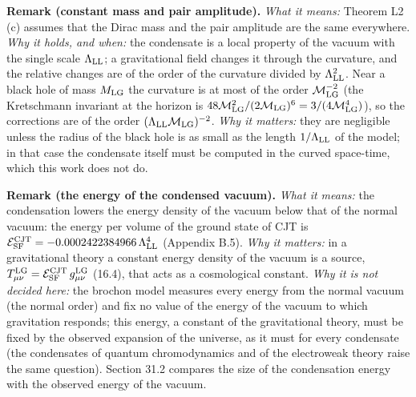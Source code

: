 \documentclass[
  10pt,
]{article}
\begin{document}
\textbf{Remark (constant mass and pair amplitude).} \emph{What it
means:} Theorem L2 (c) assumes that the Dirac mass and the pair
amplitude are the same everywhere. \emph{Why it holds, and when:} the
condensate is a local property of the vacuum with the single scale
\(\Lambda_{\rm LL}\); a gravitational field changes it through the
curvature, and the relative changes are of the order of the curvature
divided by \(\Lambda_{\rm LL}^2\). Near a black hole of mass
\(M_{\rm LG}\) the curvature is at most of the order
\(\mathcal M_{\rm LG}^{-2}\) (the Kretschmann invariant at the horizon
is
\(48\mathcal M_{\rm LG}^2/(2\mathcal M_{\rm LG})^6=3/(4\mathcal M_{\rm LG}^4)\)),
so the corrections are of the order
\((\Lambda_{\rm LL}\mathcal M_{\rm LG})^{-2}\). \emph{Why it matters:}
they are negligible unless the radius of the black hole is as small as
the length \(1/\Lambda_{\rm LL}\) of the model; in that case the
condensate itself must be computed in the curved space-time, which this
work does not do.

\textbf{Remark (the energy of the condensed vacuum).} \emph{What it
means:} the condensation lowers the energy density of the vacuum below
that of the normal vacuum: the energy per volume of the ground state of
CJT is
\(\mathcal E^{\rm CJT}_{\rm SF}=-0.0002422384966\,\Lambda_{\rm LL}^4\)
(Appendix B.5). \emph{Why it matters:} in a gravitational theory a
constant energy density of the vacuum is a source,
\(T^{\rm LG}_{\mu\nu}=\mathcal E^{\rm CJT}_{\rm SF}\,g^{\rm LG}_{\mu\nu}\)
(16.4), that acts as a cosmological constant. \emph{Why it is not
decided here:} the brochon model measures every energy from the normal
vacuum (the normal order) and fix no value of the energy of the vacuum
to which gravitation responds; this energy, a constant of the
gravitational theory, must be fixed by the observed expansion of the
universe, as it must for every condensate (the condensates of quantum
chromodynamics and of the electroweak theory raise the same question).
Section 31.2 compares the size of the condensation energy with the
observed energy of the vacuum.
\end{document}
